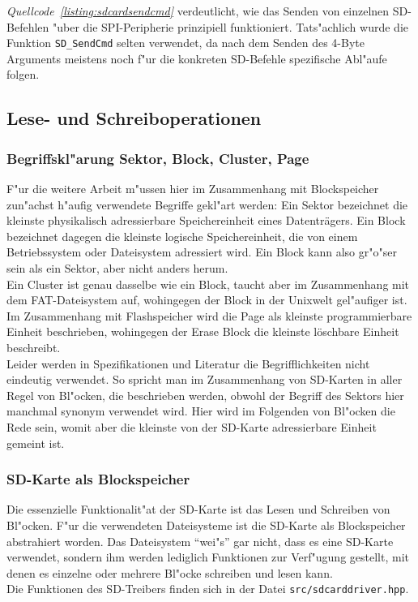 \documentclass[11pt]{article}
\newcommand*{\coderef}[1]{\textit{Quellcode~\ref{#1}}}
\newcommand{\cpp}[1]{\texttt{#1}}
\begin{document}
\coderef{listing:sdcardsendcmd} verdeutlicht, wie das Senden von einzelnen SD-Befehlen "uber die SPI-Peripherie
prinzipiell funktioniert. Tats"achlich wurde die Funktion \cpp{SD_SendCmd} selten verwendet, da nach dem 
Senden des 4-Byte Arguments meistens noch f"ur die konkreten SD-Befehle spezifische Abl"aufe folgen. 


\subsection{Lese- und Schreiboperationen}
\subsubsection{Begriffskl"arung Sektor, Block, Cluster, Page}
F"ur die weitere Arbeit m"ussen hier im Zusammenhang mit Blockspeicher 
zun"achst h"aufig verwendete Begriffe gekl"art werden:
Ein Sektor bezeichnet die kleinste physikalisch adressierbare Speichereinheit eines Datenträgers.
Ein Block bezeichnet dagegen die kleinste logische Speichereinheit, 
die von einem Betriebssystem oder Dateisystem adressiert wird. Ein Block kann also gr"o"ser
sein als ein Sektor, aber nicht anders herum.\\
Ein Cluster ist genau dasselbe wie ein Block, taucht aber im Zusammenhang mit dem
FAT-Dateisystem auf, wohingegen der Block in der Unixwelt gel"aufiger ist.\\
Im Zusammenhang mit Flashspeicher wird die Page als kleinste programmierbare Einheit beschrieben,
wohingegen der Erase Block die kleinste löschbare Einheit beschreibt.\\
Leider werden in Spezifikationen und Literatur die Begrifflichkeiten nicht eindeutig verwendet.
So spricht man im Zusammenhang von SD-Karten in aller Regel von Bl"ocken, die beschrieben werden,
obwohl der Begriff des Sektors hier manchmal synonym verwendet wird. 
Hier wird im Folgenden von Bl"ocken die Rede sein, womit aber die kleinste von 
der SD-Karte adressierbare Einheit gemeint ist.\\

\subsubsection{SD-Karte als Blockspeicher}
Die essenzielle Funktionalit"at der SD-Karte ist das Lesen und Schreiben von Bl"ocken.
F"ur die verwendeten Dateisysteme ist die SD-Karte als Blockspeicher
abstrahiert worden. Das Dateisystem \enquote{wei"s} gar nicht, dass es eine
SD-Karte verwendet, sondern ihm werden lediglich Funktionen zur Verf"ugung
gestellt, mit denen es einzelne oder mehrere Bl"ocke schreiben und lesen kann.\\
Die Funktionen des SD-Treibers finden sich in der Datei \texttt{src/sdcarddriver.hpp}.
\end{document}

